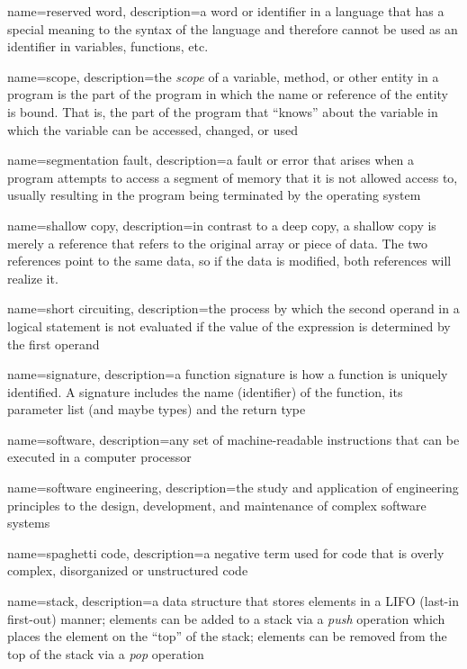 {
  name=reserved word,
  description={a word or identifier in a language that has a special meaning to the syntax of the language and 
  	therefore cannot be used as an identifier in variables, functions, etc.}
}

{
  name=scope,
  description={the \emph{scope} of a variable, method, or other entity in a program
  	is the part of the program in which the name or reference of the entity is bound.
	That is, the part of the program that ``knows'' about the variable in which the variable
	can be accessed, changed, or used}
}

{
  name=segmentation fault,
  description={a fault or error that arises when a program attempts to access a segment of memory that it is not allowed access to, usually resulting in the program being terminated by the operating system}
}

{
  name=shallow copy,
  description={in contrast to a deep copy, a shallow copy is merely a reference that refers to the original array or piece of data.  The two references point to the same data, so if the data is modified, both references will realize it.}
}

{
  name=short circuiting,
  description={the process by which the second operand in a logical statement is not evaluated if the
  	value of the expression is determined by the first operand}
}

{
  name=signature,
  description={a function signature is how a function is uniquely identified.  A signature includes the name (identifier) of the function, its parameter list (and maybe types) and the return type}
}

{
  name=software,
  description={any set of machine-readable instructions that can be executed in a computer processor}
}

{
  name=software engineering,
  description={the study and application of engineering principles to the design, development, and maintenance of complex software systems}
}

{
  name=spaghetti code,
  description={a negative term used for code that is overly complex, disorganized or unstructured code}
}

{
  name=stack,
  description={a data structure that stores elements in a LIFO (last-in first-out) manner; elements can be added to a stack via a \emph{push} operation which places the element on the ``top'' of the stack; elements can be removed from the top of the stack via a \emph{pop} operation}
}

